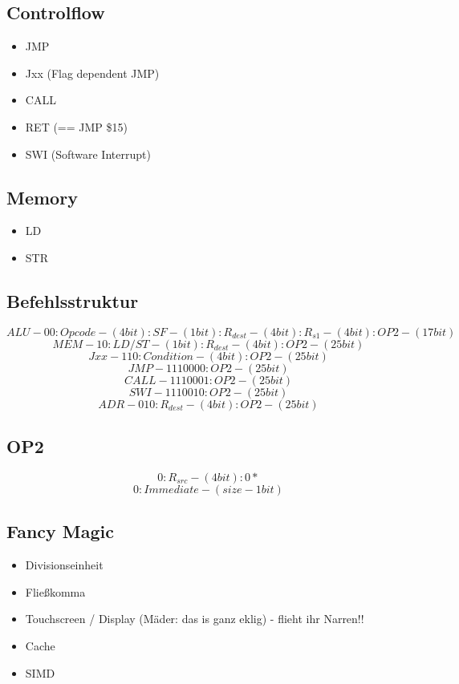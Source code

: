 \documentclass[a4paper]{article}
\begin{document}
\begin{multicols}{2}
\subsection{Controlflow}

\begin{itemize}
\item JMP
\item Jxx (Flag dependent JMP)
\item CALL
\item RET (== JMP \$15)
\item SWI (Software Interrupt)
\end{itemize}

\subsection{Memory}

\begin{itemize}
\item LD
\item STR
\end{itemize}
\end{multicols}


\subsection{Befehlsstruktur}
\[ALU - 00 : Opcode - (4bit) : SF - (1bit) : R_{dest} - (4bit) : R_{s1} - (4bit) : OP2 - (17bit)\]
\[MEM - 10 : LD/ST - (1bit) : R_{dest} - (4bit) : OP2 - (25bit)\]
\[Jxx - 110 : Condition - (4bit) : OP2 - (25bit)\]
\[JMP - 1110000 : OP2 - (25bit)\]
\[CALL- 1110001 : OP2 - (25bit)\]
\[SWI - 1110010 : OP2 - (25bit)\]
\[ADR - 010 : R_{dest} - (4bit) : OP2 - (25bit)\]

\subsection{OP2}
\[ 0 : R_{src} - (4bit) : 0* \]
\[ 0 : Immediate - (size -1 bit) \]

\subsection{Fancy Magic}

\begin{itemize}
\item Divisionseinheit
\item Fließkomma
\item Touchscreen / Display (Mäder: das is ganz eklig) - flieht ihr Narren!!
\item Cache
\item SIMD
\end{itemize}
\end{document}
